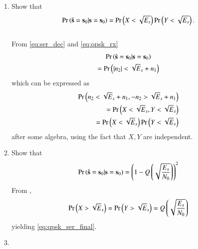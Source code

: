 \documentclass[journal,12pt,twocolumn]{IEEEtran}
\renewcommand\thesection{\arabic{section}}
\begin{document}
\begin{enumerate}[label=\thesection.\arabic*.,ref=\thesection.\theenumi]
\item

Show that 
\begin{equation}
\Pr\left(\hat{\mathbf{s}} = \mathbf{s}_0|\mathbf{s} = \mathbf{s}_0\right) =\Pr\left( X < \sqrt{E_s}\right)\Pr\left(  Y < \sqrt{E_s}\right).
\end{equation}
\\
\solution From \eqref{eq:ser_dec}  and \eqref{eq:qpsk_rx}
%
\begin{multline}
\Pr\left(\hat{\mathbf{s}} = \mathbf{s}_0|\mathbf{s} = \mathbf{s}_0\right) 
\\
= \Pr\left(\left\vert n_2\right\vert < \sqrt{E}_s+n_1\right)
\end{multline}
%
which can be expressed as
%
\begin{align}
\Pr\left({n_2} < \sqrt{E}_s+n_1,-{n_2} > \sqrt{E}_s+n_1 \right)&
\\
= \Pr\left(X < \sqrt{E}_s,Y < \sqrt{E}_s \right)&
\\
=\Pr\left(X < \sqrt{E}_s\right)\Pr\left(Y < \sqrt{E}_s \right)&
\end{align}
%
after some algebra, using the fact that $X,Y$ are independent.
\item

Show that 
\begin{equation}
\Pr\left(\hat{\mathbf{s}} = \mathbf{s}_0|\mathbf{s} = \mathbf{s}_0\right) 
 = \left(1-Q\left(\sqrt{\frac{E_s}{N_0}}\right)\right)^2
\label{eq:qpsk_ser_final}
\end{equation}
\solution From \label{prob:qpsk_xy}, 
\begin{align}
\Pr\left(X > \sqrt{E}_s\right) = \Pr\left(Y > \sqrt{E}_s\right) = Q\left(\sqrt{\frac{E_s}{N_0}}\right)
\end{align}
yielding \eqref{eq:qpsk_ser_final}.

\item


\end{enumerate}
\end{document}
